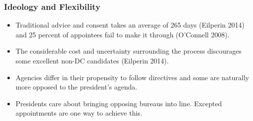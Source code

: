 \documentclass{beamer}
\begin{document}

\begin{frame}
\frametitle{Ideology and Flexibility}
\begin{itemize}\addtolength{\itemsep}{1.5\baselineskip}
\item Traditional advice and consent takes an average of 265 days (Eilperin 2014) and 25 percent of appointees fail to make it through (O'Connell 2008).
\item The considerable cost and uncertainty surrounding the process discourages some excellent non-DC candidates (Eilperin 2014). 
\item Agencies differ in their propensity to follow directives and some are naturally more opposed to the president's agenda.
\item Presidents care about bringing opposing bureaus into line. Excepted appointments are one way to achieve this.
\end{itemize}
\hfill%
\end{frame}
\end{document}
